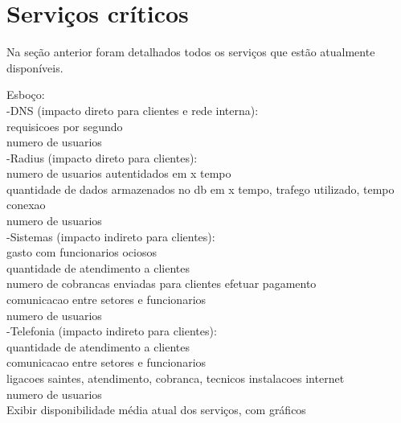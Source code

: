 \section{Serviços críticos}
\label{section:servcrit}

Na seção anterior foram detalhados todos os serviços que estão atualmente disponíveis.


Esboço:\\
-DNS (impacto direto para clientes e rede interna): \\
requisicoes por segundo\\
numero de usuarios\\
-Radius (impacto direto para clientes): \\
numero de usuarios autentidados em x tempo\\
quantidade de dados armazenados no db em x tempo, trafego utilizado, tempo conexao\\
numero de usuarios\\
-Sistemas (impacto indireto para clientes): \\
gasto com funcionarios ociosos\\
quantidade de atendimento a clientes\\
numero de cobrancas enviadas para clientes efetuar pagamento\\
comunicacao entre setores e funcionarios\\
numero de usuarios\\
-Telefonia (impacto indireto para clientes): \\
quantidade de atendimento a clientes\\
comunicacao entre setores e funcionarios\\
ligacoes saintes, atendimento, cobranca, tecnicos instalacoes internet\\
numero de usuarios\\

Exibir disponibilidade média atual dos serviços, com gráficos

